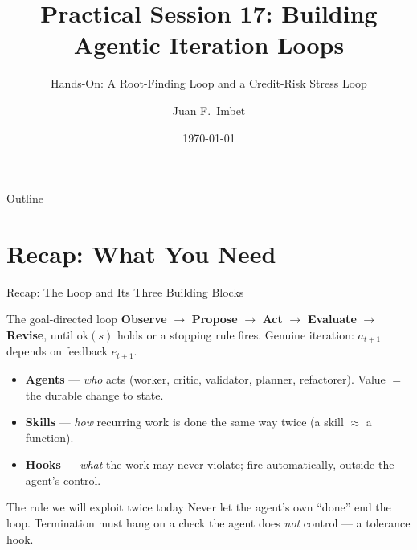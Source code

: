 \documentclass[9pt,t]{beamer}
\title{Practical Session 17: Building Agentic Iteration Loops}
\subtitle{Hands-On: A Root-Finding Loop and a Credit-Risk Stress Loop}
\author{Juan F.\ Imbet}
\institute{Paris Dauphine -- PSL University}
\date{\today}
\begin{document}
\begin{frame}\titlepage\end{frame}

\begin{frame}{Outline}\tableofcontents\end{frame}

\section{Recap: What You Need}

\begin{frame}{Recap: The Loop and Its Three Building Blocks}

\begin{block}{The goal-directed loop}
\textbf{Observe} $\to$ \textbf{Propose} $\to$ \textbf{Act} $\to$
\textbf{Evaluate} $\to$ \textbf{Revise}, until $\mathrm{ok}(s)$ holds or a
stopping rule fires. Genuine iteration: $a_{t+1}$ depends on feedback $e_{t+1}$.
\end{block}

\begin{itemize}
  \item \textbf{Agents} --- \emph{who} acts (worker, critic, validator, planner,
        refactorer). Value $=$ the durable change to state.
  \item \textbf{Skills} --- \emph{how} recurring work is done the same way twice
        (a skill $\approx$ a function).
  \item \textbf{Hooks} --- \emph{what} the work may never violate; fire
        automatically, outside the agent's control.
\end{itemize}

\medskip
\begin{alertblock}{The rule we will exploit twice today}
Never let the agent's own ``done'' end the loop. Termination must hang on a check
the agent does \emph{not} control --- a \alert{tolerance hook}.
\end{alertblock}
\end{frame}
\end{document}

